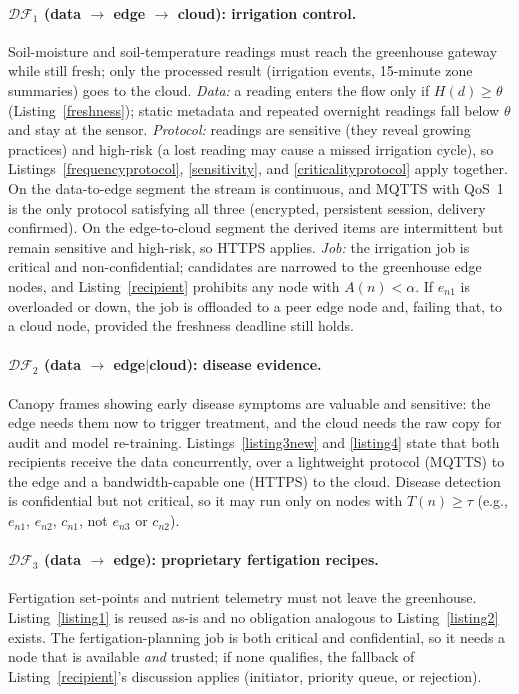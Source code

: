 \paragraph{$\mathcal{DF}_1$ (data $\rightarrow$ edge $\rightarrow$ cloud): irrigation control.}
Soil-moisture and soil-temperature readings must reach the greenhouse gateway while still fresh; only the processed
result (irrigation events, 15-minute zone summaries) goes to the cloud. \textit{Data:} a reading enters the flow
only if $H(d)\ge\theta$ (Listing~\ref{freshness}); static metadata and repeated overnight readings fall below $\theta$
and stay at the sensor. \textit{Protocol:} readings are sensitive (they reveal growing practices) and high-risk
(a lost reading may cause a missed irrigation cycle), so Listings~\ref{frequencyprotocol}, \ref{sensitivity}, and
\ref{criticalityprotocol} apply together. On the data-to-edge segment the stream is continuous, and MQTTS with QoS~1
is the only protocol satisfying all three (encrypted, persistent session, delivery confirmed). On the edge-to-cloud
segment the derived items are intermittent but remain sensitive and high-risk, so HTTPS applies. \textit{Job:} the
irrigation job is critical and non-confidential; candidates are narrowed to the greenhouse edge nodes, and
Listing~\ref{recipient} prohibits any node with $A(n)<\alpha$. If $e_{n1}$ is overloaded or down, the job is offloaded
to a peer edge node and, failing that, to a cloud node, provided the freshness deadline still holds.

\paragraph{$\mathcal{DF}_2$ (data $\rightarrow$ edge$|$cloud): disease evidence.}
Canopy frames showing early disease symptoms are valuable and sensitive: the edge needs them now to trigger
treatment, and the cloud needs the raw copy for audit and model re-training. Listings~\ref{listing3new} and
\ref{listing4} state that both recipients receive the data concurrently, over a lightweight protocol (MQTTS) to the
edge and a bandwidth-capable one (HTTPS) to the cloud. Disease detection is confidential but not critical, so it may
run only on nodes with $T(n)\ge\tau$ (e.g., $e_{n1}$, $e_{n2}$, $c_{n1}$, not $e_{n3}$ or $c_{n2}$).

\paragraph{$\mathcal{DF}_3$ (data $\rightarrow$ edge): proprietary fertigation recipes.}
Fertigation set-points and nutrient telemetry must not leave the greenhouse. Listing~\ref{listing1} is reused as-is
and no obligation analogous to Listing~\ref{listing2} exists. The fertigation-planning job is both critical and
confidential, so it needs a node that is available \emph{and} trusted; if none qualifies, the fallback of
Listing~\ref{recipient}'s discussion applies (initiator, priority queue, or rejection).

